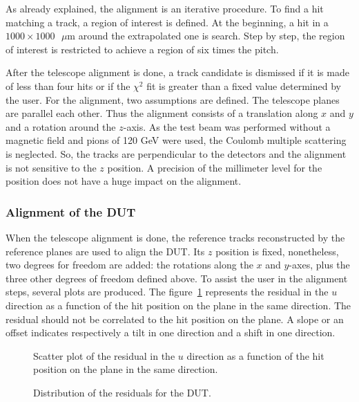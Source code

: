       As already explained, the alignment is an iterative procedure.
      To find a hit matching a track, a region of interest is defined.
      At the beginning, a hit in a $1000 \times 1000 \text{ }\mu\text{m}$ around the extrapolated one is search.
      Step by step, the region of interest is restricted to achieve a region of six times the pitch.
      
      After the telescope alignment is done, a track candidate is dismissed if it is made of less than four hits or if the $\chi^2$ fit is greater than a fixed value determined by the user. 
      For the alignment, two assumptions are defined. 
      The telescope planes are parallel each other.
      Thus the alignment consists of a translation along $x$ and $y$ and a rotation around the $z$-axis.
      As the test beam was performed without a magnetic field and pions of 120 GeV were used, the Coulomb multiple scattering is neglected.
      So, the tracks are perpendicular to the detectors and the alignment is not sensitive to the $z$ position.
      A precision of the millimeter level for the position does not have a huge impact on the alignment.

      \subsubsection{Alignment of the DUT}

      When the telescope alignment is done, the reference tracks reconstructed by the reference planes are used to align the \gls{DUT}.
      Its $z$ position is fixed, nonetheless, two degrees for freedom are added: the rotations along the $x$ and $y$-axes, plus the three other degrees of freedom defined above.
      To assist the user in the alignment steps, several plots are produced. 
      The figure~\ref{fig:UdeltaU} represents the residual in the $u$ direction as a function of the hit position on the plane in the same direction.
      The residual should not be correlated to the hit position on the plane.
      A slope or an offset indicates respectively a tilt in one direction and a shift in one direction.

      \begin{figure}
        \caption{Scatter plot of the residual in the $u$ direction as a function of the hit position on the plane in the same direction.}
        \label{fig:UdeltaU}
      \end{figure}

      \begin{figure}
        \caption{Distribution of the residuals for the DUT.}
        \label{fig:alignmentDUT}
      \end{figure}

